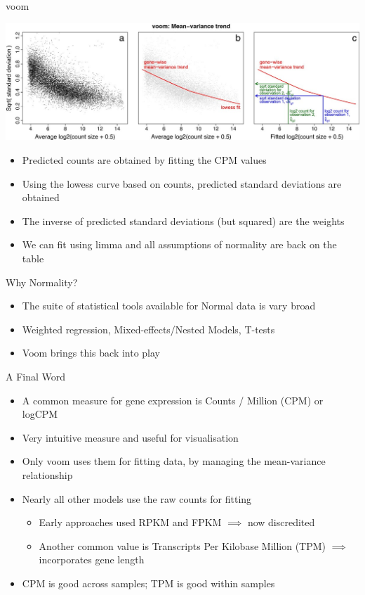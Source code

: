 \documentclass[aspectratio=169,11pt]{beamer}
\begin{document}
\begin{frame}{voom}

	
	\begin{center}
	\includegraphics[scale=0.25]{figures/voom.jpg} 
	\end{center}

	\begin{itemize}
		\item Predicted counts are obtained by fitting the CPM values
		\item Using the lowess curve based on counts, predicted standard deviations are obtained
		\item The inverse of predicted standard deviations (but squared) are the weights
		\item We can fit using limma and all assumptions of normality are back on the table
	\end{itemize}

\end{frame}

\begin{frame}{Why Normality?}

	\begin{itemize}
		\item The suite of statistical tools available for Normal data is vary broad
		\item Weighted regression, Mixed-effects/Nested Models, T-tests
		\item Voom brings this back into play
	\end{itemize}

\end{frame}

\begin{frame}{A Final Word}

	\begin{itemize}
		\item A common measure for gene expression is Counts / Million (CPM) or logCPM
		\item Very intuitive measure and useful for visualisation
		\item Only voom uses them for fitting data, by managing the mean-variance relationship
		\item Nearly all other models use the raw counts for fitting
		\begin{itemize}
			\item Early approaches used RPKM and FPKM $\implies$ now discredited
			\item Another common value is Transcripts Per Kilobase Million (TPM) $\implies$ incorporates gene length
		\end{itemize}
		\item CPM is good across samples; TPM is good within samples
	\end{itemize}
	
\end{frame}
\end{document}
